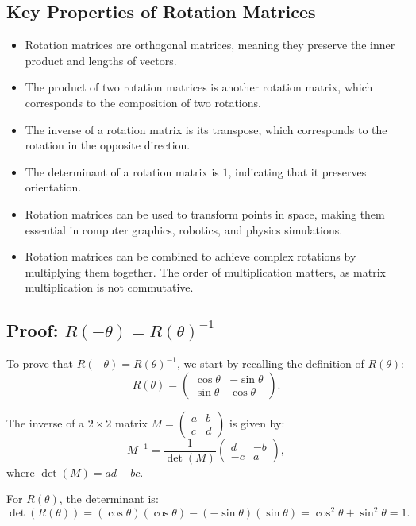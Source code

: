\documentclass{article}
\begin{document}
\subsection*{Key Properties of Rotation Matrices}
\begin{itemize}
    \item Rotation matrices are orthogonal matrices, meaning they preserve the inner product and lengths of vectors.
    \item The product of two rotation matrices is another rotation matrix, which corresponds to the composition of two rotations.
    \item The inverse of a rotation matrix is its transpose, which corresponds to the rotation in the opposite direction.
    \item The determinant of a rotation matrix is $1$, indicating that it preserves orientation.
    \item Rotation matrices can be used to transform points in space, making them essential in computer graphics, robotics, and physics simulations.
    \item Rotation matrices can be combined to achieve complex rotations by multiplying them together. The order of multiplication matters, as matrix multiplication is not commutative.
\end{itemize}

\subsection*{Proof: $R(-\theta) = R(\theta)^{-1}$}
To prove that $R(-\theta) = R(\theta)^{-1}$, we start by recalling the definition of $R(\theta)$:
\[R(\theta) = \begin{pmatrix}
\cos{\theta} & -\sin{\theta} \\
\sin{\theta} & \cos{\theta}
\end{pmatrix}.\]

The inverse of a $2 \times 2$ matrix $M = \begin{pmatrix} a & b \\ c & d \end{pmatrix}$ is given by:
\[M^{-1} = \frac{1}{\det(M)} \begin{pmatrix} d & -b \\ -c & a \end{pmatrix},\]
where $\det(M) = ad - bc$.

For $R(\theta)$, the determinant is:
\[\det(R(\theta)) = (\cos{\theta})(\cos{\theta}) - (-\sin{\theta})(\sin{\theta}) = \cos^2{\theta} + \sin^2{\theta} = 1.\]
\end{document}
